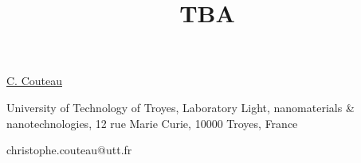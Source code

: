 \title{TBA}

\underline{C. Couteau}  

{\normalsize{\vspace{-4mm}
University of Technology of Troyes,
Laboratory Light, nanomaterials \& nanotechnologies,
12 rue Marie Curie,
10000 Troyes,
France



\email christophe.couteau@utt.fr}}


\vspace{\baselineskip}